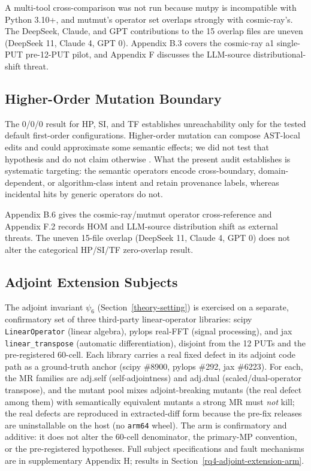 \documentclass[manuscript,screen,review]{acmart}
\begin{document}
A multi-tool cross-comparison was not run because mutpy is incompatible
with Python 3.10+, and mutmut's operator set overlaps strongly with
cosmic-ray's. The DeepSeek, Claude, and GPT contributions to the 15
overlap files are uneven (DeepSeek 11, Claude 4, GPT 0). Appendix B.3
covers the cosmic-ray a1 single-PUT pre-12-PUT pilot, and Appendix F
discusses the LLM-source distributional-shift threat.

\subsection{Higher-Order Mutation Boundary}\label{preventive-defence-framing}

The 0/0/0 result for HP, SI, and TF establishes unreachability only for
the tested default first-order configurations. Higher-order mutation
can compose AST-local edits and could approximate some semantic effects;
we did not test that hypothesis and do not claim otherwise
\citep{jia2008subtle,c03829bdd1a6e45113092384bf0fa05a064ca54a,kintis2018effective}.
What the present audit establishes is systematic targeting: the
semantic operators encode cross-boundary, domain-dependent, or
algorithm-class intent and retain provenance labels, whereas incidental
hits by generic operators do not.

Appendix B.6 gives the cosmic-ray/mutmut operator cross-reference and
Appendix F.2 records HOM and LLM-source distribution shift as external
threats. The uneven 15-file overlap (DeepSeek 11, Claude 4, GPT 0) does
not alter the categorical HP/SI/TF zero-overlap result.

\subsection{Adjoint Extension Subjects}\label{adjoint-extension-arm-subjects}

The adjoint invariant $\psi_6$ (Section~\ref{theory-setting}) is exercised on a separate,
confirmatory set of three third-party linear-operator libraries:
scipy \texttt{LinearOperator} (linear algebra), pylops real-FFT (signal
processing), and jax \texttt{linear\_transpose} (automatic
differentiation), disjoint from the 12 PUTs and the pre-registered
60-cell. Each library carries a real fixed defect in its adjoint code
path as a ground-truth anchor (scipy \#8900, pylops \#292, jax \#6223).
For each, the MR families are adj.self (self-adjointness) and adj.dual
(scaled/dual-operator transpose), and the mutant pool mixes
adjoint-breaking mutants (the real defect among them) with semantically
equivalent mutants a strong MR must \emph{not} kill; the real defects are
reproduced in extracted-diff form because the pre-fix releases are
uninstallable on the host (no \texttt{arm64} wheel). The arm is
confirmatory and additive: it does not alter the 60-cell denominator, the
primary-MP convention, or the pre-registered hypotheses. Full subject
specifications and fault mechanisms are in supplementary Appendix H;
results in Section~\ref{rq4-adjoint-extension-arm}.
\end{document}

